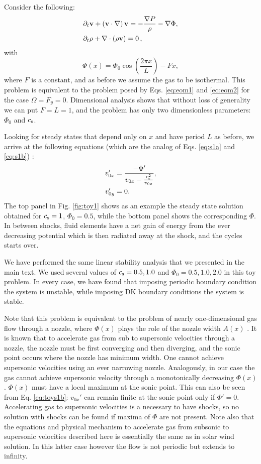 \documentclass[useAMS,usenatbib]{mn2e}
\def\pa{\partial}
\begin{document}
Consider the following:
\begin{align} 
	& \pa_t \bfv + \left( \bfv \cdot \nabla \right) \bfv  = - \frac{\nabla P}{\rho} -\nabla \Phi \label{eq:toyeom1}, \\ 
	& \pa_t \rho + \nabla \cdot \left( \rho \bfv \right) = 0 \, , \label{eq:toyeom2}
\end{align}
with 
\begin{equation}
\Phi(x) = \Phi_0 \cos\left( \frac{2 \pi x}{L} \right) - F x,
\end{equation}
where $F$ is a constant, and as before we assume the gas to be isothermal. This problem is equivalent to the problem posed by Eqs. \eqref{eq:eom1} and \eqref{eq:eom2} for the case $\Omega=F_y=0$. Dimensional analysis shows that without loss of generality we can put $F=L=1$, and the problem has only two dimensionless parameters: $\Phi_0$ and $c_{\rm s}$.

Looking for steady states that depend only on $x$ and have period $L$ as before, we arrive at the following equations (which are the analog of Eqs. \ref{eq:s1a} and \ref{eq:s1b}) :
\begin{align}
v_{0x}' & = \frac{- \Phi'}{ v_{0x} - \frac{c_{\rm s}^2}{v_{0x}}}, \label{eq:toys1b} \\
v_{0y}' & = 0. \label{eq:toys1b}
\end{align}
The top panel in Fig. \ref{fig:toy1} shows as an example the steady state solution obtained for $c_{\rm s}=1$, $\Phi_0=0.5$, while the bottom panel shows the corresponding $\Phi$. In between shocks, fluid elements have a net gain of energy from the ever decreasing potential which is then radiated away at the shock, and the cycles starts over.

We have performed the same linear stability analysis that we presented in the main text. We used several values of $c_{\rm s}=0.5,1.0$ and $\Phi_0=0.5,1.0,2.0$ in this toy problem. In every case, we have found that imposing periodic boundary condition the system is unstable, while imposing DK boundary conditions the system is stable.

Note that this problem is equivalent to the problem of nearly one-dimensional gas flow through a nozzle, where $\Phi(x)$ plays the role of the nozzle width $A(x)$ \citep[see for example  in][]{landau}. It is known that to accelerate gas from sub to supersonic velocities through a nozzle, the nozzle must be first converging and then diverging, and the sonic point occurs where the nozzle has minimum width. One cannot achieve supersonic velocities using an ever narrowing nozzle. Analogously, in our case the gas cannot achieve supersonic velocity through a monotonically decreasing $\Phi(x)$. $\Phi(x)$ must have a local maximum at the sonic point. This can also be seen from Eq. \eqref{eq:toys1b}: $v_{0x}' $ can remain finite at the sonic point only if $\Phi'=0$. Accelerating gas to supersonic velocities is a necessary to have shocks, so no solution with shocks can be found if maxima of $\Phi$ are not present. Note also that the equations and physical mechanism to accelerate gas from subsonic to supersonic velocities described here is essentially the same as in \cite{Parker1958,Parker1965} solar wind solution. In this latter case however the flow is not periodic but extends to infinity. 
\end{document}
